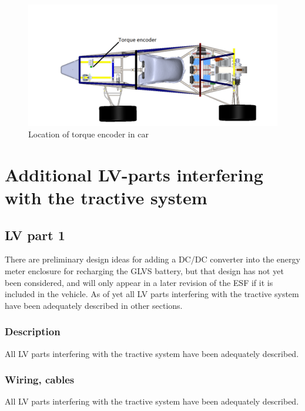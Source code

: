 \documentclass{article}
\begin{document}
\begin{figure}[H]
    \centering
    \includegraphics[width=\linewidth]{encoder_car_location}
    \caption{Location of torque encoder in car} 
    \label{fig:encoder_car}
\end{figure}


\section{Additional LV-parts interfering with the tractive system}
\subsection{LV part 1}
There are preliminary design ideas for adding a DC/DC converter into the energy meter enclosure for recharging the GLVS battery, but that design has not yet been considered, and will only appear in a later revision of the ESF if it is included in the vehicle. As of yet all LV parts interfering with the tractive system have been adequately described in other sections.

\subsubsection{Description}
All LV parts interfering with the tractive system have been adequately described. 

\subsubsection*{Wiring, cables}
All LV parts interfering with the tractive system have been adequately described. 
\end{document}
